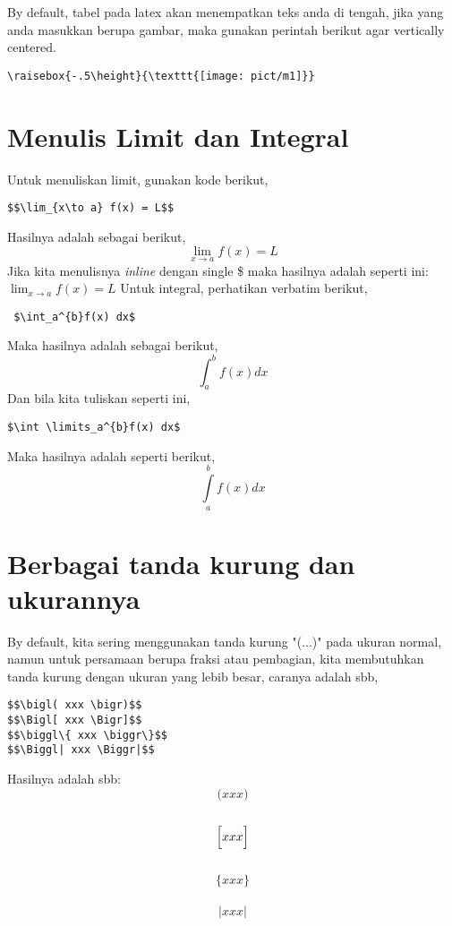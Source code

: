 \documentclass[12pt]{article}
\begin{document}
By default, tabel pada latex akan menempatkan teks anda di tengah, jika yang anda masukkan berupa gambar, maka gunakan perintah berikut agar vertically centered.
\begin{verbatim}
\raisebox{-.5\height}{\texttt{[image: pict/m1]}}
\end{verbatim}

\section{Menulis Limit dan Integral}
Untuk menuliskan limit, gunakan kode berikut,
\begin{verbatim}
$$\lim_{x\to a} f(x) = L$$ 
\end{verbatim}
Hasilnya adalah sebagai berikut, \\
$$\lim_{x\to a} f(x) = L $$
Jika kita menulisnya \emph{inline} dengan single \$ maka hasilnya adalah seperti ini:
$\lim_{x\to a} f(x) = L$
Untuk integral, perhatikan verbatim berikut,
\begin{verbatim}
 $\int_a^{b}f(x) dx$
\end{verbatim}
Maka hasilnya adalah sebagai berikut, \\
$$\int_a^{b}f(x) dx$$
Dan bila kita tuliskan seperti ini, \\
\begin{verbatim}
$\int \limits_a^{b}f(x) dx$
\end{verbatim}
Maka hasilnya adalah seperti berikut, \\
$$\int \limits_a^{b}f(x) dx$$

\section{Berbagai tanda kurung dan ukurannya}
By default, kita sering menggunakan tanda kurung "(...)" pada ukuran normal, namun untuk persamaan berupa fraksi atau pembagian, kita membutuhkan tanda kurung dengan ukuran yang lebib besar, caranya adalah sbb,
\begin{verbatim}
$$\bigl( xxx \bigr)$$
$$\Bigl[ xxx \Bigr]$$
$$\biggl\{ xxx \biggr\}$$
$$\Biggl| xxx \Biggr|$$
\end{verbatim}
Hasilnya adalah sbb:\\
$$\bigl( xxx \bigr)$$ \\
$$\Bigl[ xxx \Bigr]$$  \\
$$\biggl\{ xxx \biggr\}$$ \\
$$\Biggl| xxx \Biggr|$$ 
\end{document}
